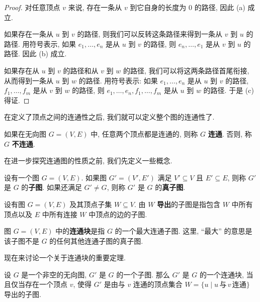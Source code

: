 \begin{proof}
    对任意顶点 $v$ 来说, 存在一条从 $v$ 到它自身的长度为 $0$ 的路径, 因此 (a) 成立.

    如果存在一条从 $u$ 到 $v$ 的路径, 则我们可以反转这条路径来得到一条从 $v$ 到 $u$ 的路径. 用符号表示, 如果 $e_1,\dots,e_n$ 是从 $u$ 到 $v$ 的路径, 则 $e_n,\dots,e_1$ 是从 $v$ 到 $u$ 的路径. 因此 (b) 成立.

    如果存在从 $u$ 到 $v$ 的路径和从 $v$ 到 $w$ 的路径, 我们可以将这两条路径首尾衔接, 从而得到一条从 $u$ 到 $w$ 的路径. 用符号表示: 如果 $e_1,\dots,e_n$ 是从 $u$ 到 $v$ 的路径, $f_1,\dots,f_m$ 是从 $v$ 到 $w$ 的路径, 则 $e_1,\dots,e_n,f_1,\dots,f_m$ 是从 $u$ 到 $w$ 的路径. 于是 (c) 得证.
\end{proof}

在定义了顶点之间的连通性之后, 我们就可以定义整个图的连通性了.

\begin{definition}[连通图]
    如果在无向图 $G=(V,E)$ 中, 任意两个顶点都是连通的, 则称 $G$ \textbf{连通}. 否则, 称 $G$ \textbf{不连通}.
\end{definition}

在进一步探究连通图的性质之前, 我们先定义一些概念.

\begin{definition}[子图]
     设有一个图 $G=(V,E)$. 如果图 $G'=(V',E')$ 满足 $V'\subseteq V$ 且 $E'\subseteq E$, 则称 $G'$ 是 $G$ 的\textbf{子图}. 如果还满足 $G'\neq G$, 则称 $G'$ 是 $G$ 的\textbf{真子图}.
\end{definition}

\begin{definition}[导出子图]
    设有图 $G=(V,E)$ 及其顶点子集 $W\subseteq V$. 由 $W$ \textbf{导出}的子图是指包含 $W$ 中所有顶点以及 $E$ 中所有连接 $W$ 中顶点的边的子图.
\end{definition}

\begin{definition}[连通块]
    图 $G=(V,E)$ 中的\textbf{连通块}是指 $G$ 的一个最大连通子图. 这里, ``最大'' 的意思是该子图不是 $G$ 的任何其他连通子图的真子图.
\end{definition}

现在来讨论一个关于连通块的重要定理.

\begin{theorem}\label{thm:theorem about connected components}
    设 $G$ 是一个非空的无向图, $G'$ 是 $G$ 的一个子图. 那么 $G'$ 是 $G$ 的一个连通块, 当且仅当存在一个顶点 $v$, 使得 $G'$ 是由与 $v$ 连通的顶点集合 $W=\{u\mid u\,\text{与}\,v\,\text{连通}\}$ 导出的子图.
\end{theorem}

